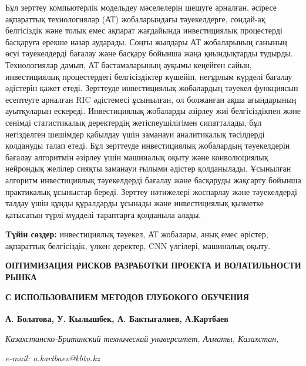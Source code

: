 {Бұл зерттеу компьютерлік модельдеу мәселелерін шешуге арналған, әсіресе
ақпараттық технологиялар (АТ) жобаларындағы тәуекелдерге, сондай-ақ
белгісіздік және толық емес ақпарат жағдайында инвестициялық процестерді
басқаруға ерекше назар аударады. Соңғы жылдары АТ жобаларының санының
өсуі тәуекелдерді бағалау және басқару бойынша жаңа қиындықтарды
тудырды. Технологиялар дамып, АТ бастамаларының ауқымы кеңейген сайын,
инвестициялық процестердегі белгісіздіктер күшейіп, неғұрлым күрделі
бағалау әдістерін қажет етеді. Зерттеуде инвестициялық жобалардың
тәуекел функциясын есептеуге арналған RIC әдістемесі ұсынылған, ол
болжанған ақша ағындарының ауытқуларын ескереді. Инвестициялық жобаларды
әзірлеу жиі белгісіздікпен және сенімді статистикалық деректердің
жетіспеушілігімен сипатталады, бұл негізделген шешімдер қабылдау үшін
заманауи аналитикалық тәсілдерді қолдануды талап етеді. Бұл зерттеуде
инвестициялық жобалардың тәуекелдерін бағалау алгоритмін әзірлеу үшін
машиналық оқыту және конволюциялық нейрондық желілер сияқты заманауи
ғылыми әдістер қолданылады. Ұсынылған алгоритм инвестициялық
тәуекелдерді бағалау және басқаруды жақсарту бойынша практикалық
ұсыныстар береді. Зерттеу нәтижелері жоспарлау және тәуекелдерді талдау
үшін құнды құралдарды ұсынады және инвестициялық қызметке қатысатын
түрлі мүдделі тараптарға қолданыла алады.

{\bfseries Tүйін сөздер:} инвестициялық тәуекел, АТ жобалары, анық емес
өрістер, ақпараттық белгісіздік, үлкен деректер, CNN үлгілері, машиналық
оқыту.

{\bfseries ОПТИМИЗАЦИЯ РИСКОВ РАЗРАБОТКИ ПРОЕКТА И ВОЛАТИЛЬНОСТИ РЫНКА}

{\bfseries С ИСПОЛЬЗОВАНИЕМ МЕТОДОВ ГЛУБОКОГО ОБУЧЕНИЯ}

{\bfseries А. Болатова, У. Кылышбек, А. Бактыгалиев,
А.Картбаев\textsuperscript{\envelope }}

\emph{Казахстанско-Британский технический университет, Алматы,
Казахстан,}

\emph{e-mail: a.kartbaev@kbtu.kz}

}
